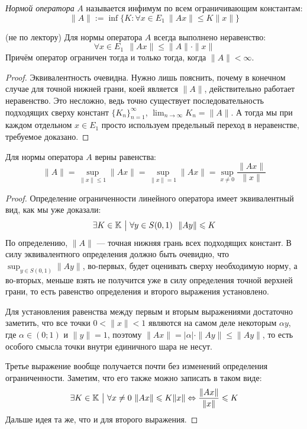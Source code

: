 \begin{definition}
	\textit{Нормой оператора} $A$ называется инфимум по всем ограничивающим константам:
	\[
		\|A\| := \inf \{K \colon \forall x \in E_1\ \|Ax\| \le K\|x\|\}
	\]
\end{definition}

\begin{proposition} (не по лектору)
	Для нормы оператора $A$ всегда выполнено неравенство:
	\[
		\forall x \in E_1\ \ \|Ax\| \le \|A\| \cdot \|x\|
	\]
	Причём оператор ограничен тогда и только тогда, когда $\|A\| < \infty$.
\end{proposition}

\begin{proof}
	Эквивалентность очевидна. Нужно лишь пояснить, почему в конечном случае для точной нижней грани, коей является $\|A\|$, действительно работает неравенство. Это несложно, ведь точно существует последовательность подходящих сверху констант $\{K_n\}_{n = 1}^\infty$, $\lim_{n \to \infty} K_n = \|A\|$. А тогда мы при каждом отдельном $x \in E_1$ просто используем предельный переход в неравенстве, требуемое доказано.
\end{proof}

\begin{proposition}
	Для нормы оператора $A$ верны равенства:
	\[
		\|A\| = \sup_{\|x\| \le 1} \|Ax\| = \sup_{\|x\| = 1} \|Ax\| = \sup_{x \neq 0} \frac{\|Ax\|}{\|x\|}
	\]
\end{proposition}

\begin{proof}
	Определение ограниченности линейного оператора имеет эквивалентный вид, как мы уже доказали:
	\[
		\exists K \in \K \such \forall y \in S(0, 1)\ \ \|Ay\| \le K
	\]
	По определению, $\|A\|$ --- точная нижняя грань всех подходящих констант. В силу эквивалентного определения должно быть очевидно, что $\sup_{y \in S(0, 1)} \|Ay\|$, во-первых, будет оценивать сверху необходимую норму, а во-вторых, меньше взять не получится уже в силу определения точной верхней грани, то есть равенство определения и второго выражения установлено.
	
	Для установления равенства между первым и вторым выражениями достаточно заметить, что все точки $0 < \|x\| < 1$ являются на самом деле некоторым $\alpha y$, где $\alpha \in (0; 1)$ и $\|y\| = 1$, поэтому $\|Ax\| = |\alpha| \cdot \|Ay\| \le \|Ay\|$, то есть особого смысла точки внутри единичного шара не несут.
	
	Третье выражение вообще получается почти без изменений определения ограниченности. Заметим, что его также можно записать в таком виде:
	\[
		\exists K \in \K \such \forall x \neq 0\ \|Ax\| \le K\|x\| \Lra \frac{\|Ax\|}{\|x\|} \le K
	\]
	Дальше идея та же, что и для второго выражения.
\end{proof}

